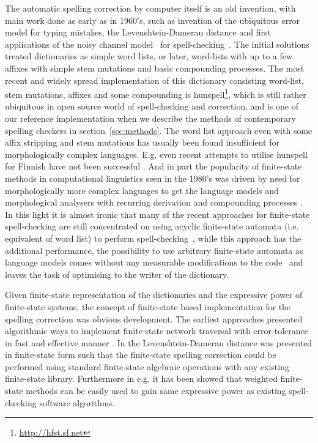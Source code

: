 \documentclass[a4paper,12pt]{article}
\begin{document}
The automatic spelling correction by computer itself is an old invention, with
main work done as early as in 1960's, such as invention of the ubiquitous error
model for typing mistakes, the Levenshtein-Damerau distance
\cite{levenshtein/1966,damerau/1964} and first applications of the noisy
channel model~\cite{shannon/1948} for spell-checking~\cite{raviv/1967}.  The
initial solutions treated dictionaries as simple word lists, or later,
word-lists with up to a few affixes with simple stem mutations and basic
compounding processes. The most recent and widely spread implementation of this
dictionary consisting word-list, stem mutations, affixes and some compounding
is hunspell\footnote{\url{http://hfst.sf.net}}, which is still rather
ubiquitous in open source world of spell-checking and correction, and is one of
our reference implementation when we describe the methods of contemporary
spelling checkers in section~\ref{sec:methods}. The word list approach even
with some affix stripping and stem mutations has usually been found
insufficient for morphologically complex languages.  E.g. even recent attempts
to utilise hunspell for Finnish have not been successful
\cite[]{pitkanen/2006}. And in part the popularity of finite-state methods in
computational linguistics seen in the 1980's was driven by need for
morphologically more complex languages to get the language models and
morphological analysers with recurring derivation and compounding processes
\cite[]{beesley2004morphological}.  In this light it is almost ironic that many
of the recent approaches for finite-state spell-checking are still concentrated
on using acyclic finite-state automata (i.e. equivalent of word list) to
perform spell-checking~\cite[]{watson2003new,deorowicz2005correcting}, while
this approach has the additional performance, the possibility to use arbitrary
finite-state automata as language models comes without any measurable
modifications to the code~\cite[e.g.][]{pirinen/2010/lrec} and leaves the task
of optimising to the writer of the dictionary.

Given finite-state representation of the dictionaries and the expressive power
of finite-state systems, the concept of finite-state based implementation for
the spelling correction was obvious development. The earliest approaches
presented algorithmic ways to implement finite-state network traversal with
error-tolerance \cite[]{oflazer/1996} in fast and effective manner
\cite[]{agata/2002,hulden/2009}.  In \cite{schulz/2002} the Levenshtein-Damerau
distance was presented in finite-state form such that the finite-state spelling
correction could be performed using standard finite-state algebraic operations
with any existing finite-state library. Furthermore in e.g.
\cite{pirinen/2010/lrec} it has been showed that weighted finite-state methods
can be easily used to gain same expressive power as existing spell-checking
software algorithms.
\end{document}
